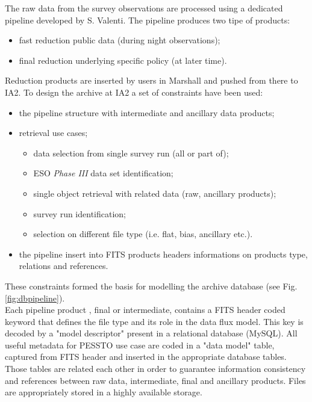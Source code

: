 \documentclass[11pt,twoside]{article}
\begin{document}
The raw data from the survey observations are processed using a dedicated pipeline developed by S. Valenti. The pipeline produces two tipe of products:
\begin{itemize}[noitemsep,nolistsep]
	\item fast reduction public data (during night observations);
	\item final reduction underlying specific policy (at later time).
\end{itemize}
Reduction products are inserted by users in Marshall and pushed from there to IA2. 
To design the archive at IA2 a set of constraints have been used:
\begin{itemize}[noitemsep,nolistsep]
	\item the pipeline structure with intermediate and ancillary data products;
	\item retrieval use cases;
		\begin{itemize}[noitemsep,nolistsep]
			\item data selection from single survey run (all or part of);
			\item ESO \textit{Phase III} data set identification;
			\item single object retrieval with related data (raw, ancillary products);
			\item survey run identification;
			\item selection on different file type (i.e. flat, bias, ancillary etc.).
		\end{itemize}
	\item the pipeline insert into FITS products headers informations on products type, relations and references.
\end{itemize}
These constraints formed the basis for modelling the archive database (see Fig. \ref{fig:dbpipeline}).\\
Each pipeline product , final or intermediate, contains a FITS header coded keyword that defines the file type and its role in the data flux model. This key is decoded by a "model descriptor" present in a relational database (MySQL). All useful metadata for PESSTO use case are coded in a "data model" table, captured from FITS header and inserted in the appropriate database tables. Those tables are related each other in order to guarantee information consistency and references between raw data, intermediate, final and ancillary products. Files are appropriately stored in a highly available storage.
\end{document}
